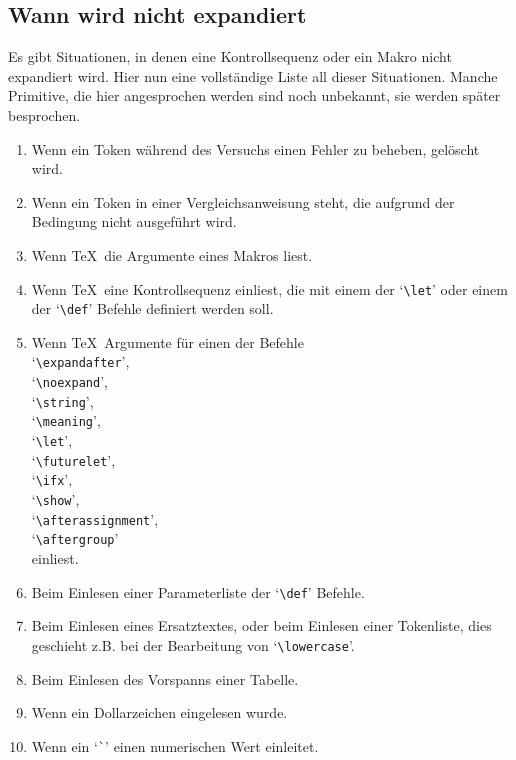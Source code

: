 \subsection{Wann wird nicht expandiert}
Es gibt Situationen, in denen eine 
Kontrollsequenz oder ein Makro
nicht expandiert wird. Hier nun eine vollst\"andige Liste all dieser
Situationen. Manche 
Primitive, die hier angesprochen werden sind noch
unbekannt, sie werden sp\"ater
besprochen.
\begin{enumerate}
\item Wenn ein Token w\"ahrend des Versuchs einen Fehler zu beheben,
gel\"oscht wird.
\item Wenn ein Token in einer Vergleichsanweisung steht, die aufgrund
der Bedingung nicht ausgef\"uhrt wird.
\item Wenn \TeX\ die Argumente eines Makros liest.
\item Wenn \TeX\ eine 
Kontrollsequenz einliest, die mit einem der
`\verb|\let|' oder einem der 
`\verb|\def|' Befehle definiert werden soll.
\item Wenn \TeX\ Argumente f\"ur einen der Befehle
\\
`\verb|\expandafter|',\\
`\verb|\noexpand|',\\
`\verb|\string|',\\
`\verb|\meaning|',\\
`\verb|\let|',\\
`\verb|\futurelet|',\\
`\verb|\ifx|',\\
`\verb|\show|',\\
`\verb|\afterassignment|',\\
`\verb|\aftergroup|'\\einliest.
\item Beim Einlesen einer 
Parameterliste der `\verb|\def|' Befehle.
\item Beim Einlesen eines Ersatztextes, oder beim Einlesen einer
Tokenliste, dies geschieht z.B. bei der Bearbeitung von
`\verb|\lowercase|'.
\item Beim Einlesen des Vorspanns einer Tabelle.
\item Wenn ein Dollarzeichen eingelesen wurde.
\item Wenn ein `\verb|`|' einen numerischen Wert einleitet.
\end{enumerate}
